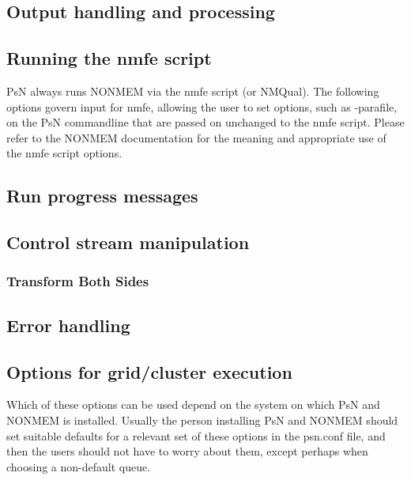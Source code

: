 \subsection{Output handling and processing}


\subsection{Running the nmfe script}
PsN always runs NONMEM via the nmfe script (or NMQual). 
The following options govern input for
nmfe, allowing the user to set options, such as -parafile, on the PsN commandline that
are passed on unchanged to the nmfe script.
Please refer to the NONMEM documentation for the meaning and appropriate use
of the nmfe script options.


\subsection{Run progress messages}


\subsection{Control stream manipulation}

\subsubsection{Transform Both Sides}



\subsection{Error handling}



\subsection{Options for grid/cluster execution}
Which of these options can be used depend on the system on which PsN and NONMEM is installed.
Usually the person installing PsN and NONMEM should set suitable defaults for a relevant set
of these
options in the psn.conf file, and then the users should not have to worry about them,
except perhaps when choosing a non-default queue.




